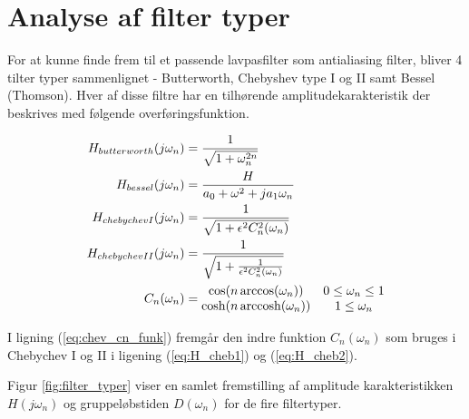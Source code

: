 \section{Analyse af filter typer}\label{sec:filter_analyse}
For at kunne finde frem til et passende lavpasfilter som antialiasing filter, bliver 4 tilter typer sammenlignet - Butterworth, Chebyshev type I og II samt Bessel (Thomson).
Hver af disse filtre har en tilhørende amplitudekarakteristik der beskrives med følgende overføringsfunktion\cite{anfilter}.

\begin{align} 
H_{butterworth}(j\omega_n) &= \frac{1}{\sqrt{1 + \omega_n^{2n}}} \label{eq:H_butt} \\
H_{bessel} (j\omega_n) &= \frac{H}{a_0 + \omega^2 + ja_1\omega_n} \label{eq:H_bes}\\
H_{chebychevI}(j\omega_n) &= \frac{1}{\sqrt{1 + \epsilon^2 C_n^2(\omega_n)}} \label{eq:H_cheb1} \\
H_{chebychevII}(j\omega_n) &= \frac{1}{\sqrt{1 + \frac{1}{\epsilon^2 C_n^2(\omega_n)}}} \label{eq:H_cheb2} \\
C_n(\omega_n) &=  
\begin{matrix}
	\cos(n\arccos(\omega_n)) & 0 \le \omega_n \le 1 \\  \cosh(n \operatorname{arccosh}(\omega_n)) & 1 \le \omega_n 
\end{matrix} \label{eq:chev_cn_funk}
\end{align}

I ligning (\ref{eq:chev_cn_funk}) fremgår den indre funktion $C_n(\omega_n)$ som bruges i Chebychev I og II i ligening (\ref{eq:H_cheb1}) og (\ref{eq:H_cheb2}).

Figur \ref{fig:filter_typer} viser en samlet fremstilling af amplitude karakteristikken $H(j\omega_n)$ og gruppeløbstiden $D(\omega_n)$ for de fire filtertyper.

